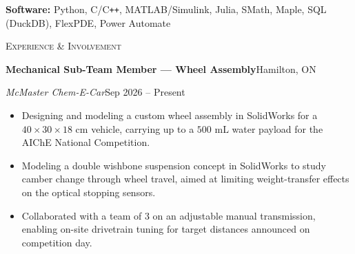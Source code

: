 \documentclass[a4paper]{article}
\newcommand{\lineunder} {
    \par\vspace*{-2pt}
    \noindent\hrulefill
    \par\vspace*{2pt}
}
\newcommand{\header}[1]{
    \vspace*{3pt}
    {\large\textsc{#1}}
    \lineunder
}
\begin{document}
\textbf{Software:} Python, C/C\texttt{++}, MATLAB/Simulink, Julia, SMath, Maple, SQL (DuckDB), FlexPDE, Power Automate

\vspace{1.5mm}

\header{Experience \& Involvement}
\vspace{1.5mm}

\textbf{Mechanical Sub-Team Member --- Wheel Assembly}\hfill Hamilton, ON \par
\textit{McMaster Chem-E-Car}\hfill Sep 2026 -- Present
\vspace{1mm}
\begin{itemize}
    \item Designing and modeling a custom wheel assembly in SolidWorks for a $40 \times 30 \times 18\text{ cm}$ vehicle, carrying up to a $500\text{ mL}$ water payload for the AIChE National Competition.
    \item Modeling a double wishbone suspension concept in SolidWorks to study camber change through wheel travel, aimed at limiting weight-transfer effects on the optical stopping sensors.
    \item Collaborated with a team of 3 on an adjustable manual transmission, enabling on-site drivetrain tuning for target distances announced on competition day.
\end{itemize}

\vspace{1.5mm}
\end{document}
